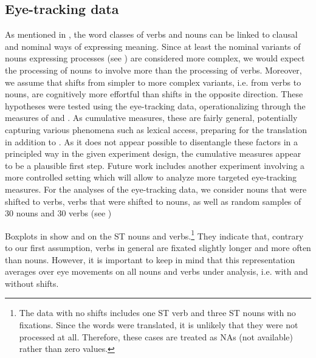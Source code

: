 \documentclass[output=paper]{LSP/langsci}
\begin{document}
\subsection{Eye-tracking data}\label{serbinaetal:sec:5:2}
As mentioned in , the word classes of verbs and nouns can be linked to clausal and nominal ways of expressing meaning. Since at least the nominal variants of nouns expressing processes (see \citealt{Fontaine2017}) are considered more complex, we would expect the processing of nouns to involve more  than the processing of verbs. Moreover, we assume that shifts from simpler to more complex variants, i.e. from verbs to nouns, are cognitively more effortful than shifts in the opposite direction. These hypotheses were tested using the eye-tracking data, operationalizing  through the measures of  and  \citep{Holmqvist2011}. As cumulative measures, these are fairly general, potentially capturing various phenomena such as lexical access, preparing for the translation in addition to . As it does not appear possible to disentangle these factors in a principled way in the given experiment design, the cumulative measures appear to be a plausible first step. Future work includes another experiment involving a more controlled setting which will allow to analyze more targeted eye-tracking measures. For the analyses of the eye-tracking data, we consider nouns that were shifted to verbs, verbs that were shifted to nouns, as well as random samples of 30 nouns and 30 verbs (see )

\newpage 
Boxplots in  show  and  on the ST nouns and verbs.\footnote{The data with no shifts includes one ST verb and three ST nouns with no fixations. Since the words were translated, it is unlikely that they were not processed at all. Therefore, these cases are treated as NAs (not available) rather than zero values.} They indicate that, contrary to our first assumption, verbs in general are fixated slightly longer and more often than nouns. However, it is important to keep in mind that this representation averages over eye movements on all nouns and verbs under analysis, i.e. with and without shifts. 
\end{document}
